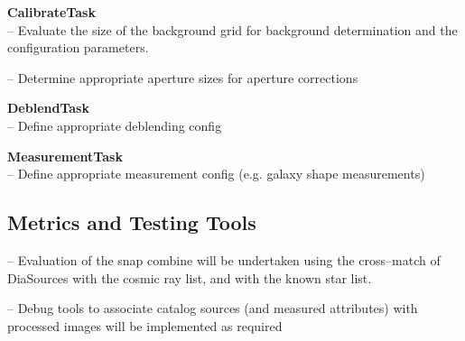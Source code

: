 \documentclass[prd, nofootinbib, floatfix, 11pt,tightenlines,times]{article}
\begin{document}



%


{\bf CalibrateTask}\\
-- Evaluate the size of the background grid for background
determination and the configuration parameters.

-- Determine appropriate  aperture sizes for aperture corrections%

{\bf DeblendTask}\\
-- Define appropriate deblending config


{\bf MeasurementTask}\\
-- Define appropriate measurement config (e.g. galaxy shape measurements)

\subsection{Metrics and Testing Tools}


-- Evaluation of the snap combine will be undertaken using the
cross--match of DiaSources with the cosmic ray list, and with the
known star list.

-- Debug tools to associate catalog sources (and measured attributes)
with processed images will be implemented as required
\end{document}
